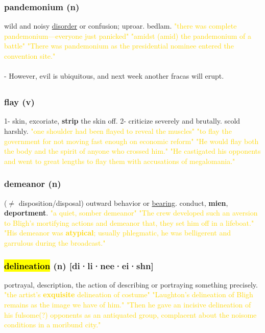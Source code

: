 \documentclass{proc}
\begin{document}
	\subsubsection{\textcolor{brickred}{pandemonium} (n)}
	wild and noisy \underline{disorder} or confusion; uproar. bedlam.
	\textcolor{gold}{"there was complete pandemonium—everyone just panicked" "amidst (amid) the pandemonium of a battle" "There was pandemonium as the presidential nominee entered the convention site."}\\\\
	- However, evil is ubiquitous, and next week another fracas will erupt. 
	
	\newpage
	\subsection{}
	\subsubsection{\textcolor{brickred}{flay} (v)}
	1- skin, excoriate, \textbf{strip} the skin off.
	2- criticize severely and brutally. scold harshly.
	\textcolor{gold}{"one shoulder had been flayed to reveal the muscles" "to flay the government for not moving fast enough on economic reform" "He would flay both the body and the spirit of anyone who crossed him." "He castigated his opponents and went to great lengths to flay them with accusations of megalomania."}
	
	\subsubsection{\textcolor{brickred}{demeanor} (n)}
	($\ne$ disposition/disposal) outward behavior or \underline{bearing}. conduct, \textbf{mien}, \textbf{deportment}.
	\textcolor{gold}{"a quiet, somber demeanor" "The crew developed such an aversion to Bligh's mortifying actions and demeanor that, they set him off in a lifeboat." "His demeanor was \textbf{atypical}; usually phlegmatic, he was belligerent and garrulous during the broadcast."}
	
	\subsubsection{\textcolor{brickred}{\hl{delineation}} (n) [di·li·nee·ei·shn]}
	portrayal,
	description,
	the action of describing or portraying something precisely.
	\textcolor{gold}{"the artist's \textbf{exquisite} delineation of costume" "Laughton's delineation 
		of Bligh remains as the image we have of him." "Then he gave an incisive delineation of his fulsome(?) opponents as an
		antiquated group, complacent about the noisome conditions in a moribund city."}
	
\end{document}
